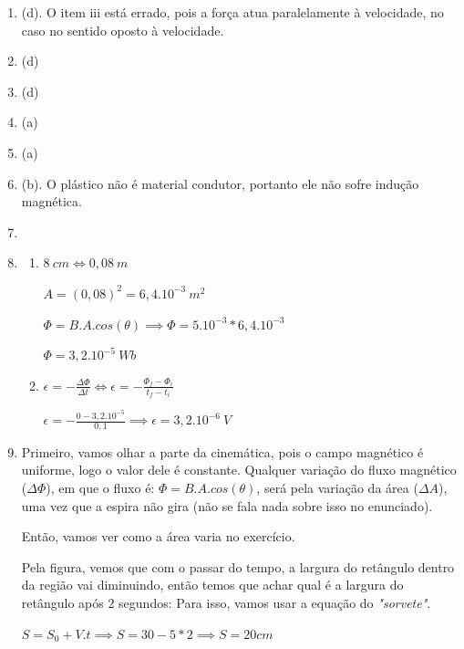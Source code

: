 \documentclass[12pt,letterpaper,fleqn]{article}
\begin{document}
    \begin{enumerate}
        \item (d). O item iii está errado, pois a força atua paralelamente à velocidade, no caso no sentido oposto à velocidade.
        
        \item (d)
        \item (d)
        \item (a)
        \item (a)
        \item (b). O plástico não é material condutor, portanto ele não sofre indução magnética.
        \item 
        \item \begin{enumerate}
            \item $8\: cm \iff 0,08 \: m$
            
            $A= (0,08)^2 = 6,4.10^{-3}\:m^2$
            
            $\Phi = B.A.cos(\theta) \implies \Phi = 5.10^{-3}*6,4.10^{-3}$
            
            $\Phi = 3,2.10^{-5} \: Wb$
            
            \item $\epsilon = -\frac{\Delta \Phi}{\Delta t} \iff \epsilon= - \frac{\Phi_f - \Phi_i}{t_f-t_i}$
            
            $\epsilon = - \frac{0 - 3,2.10^{-5}}{0,1} \implies \epsilon = 3,2.10^{-6} \: V$
        \end{enumerate}
        
        \item Primeiro, vamos olhar a parte da cinemática, pois o campo magnético é uniforme, logo o valor dele é constante. Qualquer variação do fluxo magnético ($\Delta \Phi$), em que o fluxo é: $\Phi= B.A.cos(\theta)$, será pela variação da área ($\Delta A$), uma vez que a espira não gira (não se fala nada sobre isso no enunciado). 
     
        Então, vamos ver como a área varia no exercício. 
        
        Pela figura, vemos que com o passar do tempo, a largura do retângulo dentro da região vai diminuindo, então temos que achar qual é a largura do retângulo após 2 segundos: Para isso, vamos usar a equação do \textit{"sorvete"}.
        
        $S = S_0 + V.t \implies S = 30 - 5*2 \implies S = 20cm$
        

\end{enumerate}
\end{document}
